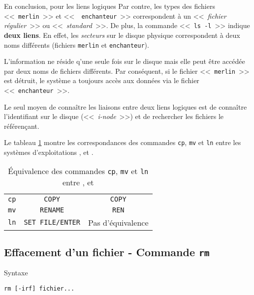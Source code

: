 \begin{definition}{En conclusion, pour les liens logiques}
Par contre, les types des fichiers <<~{\tt merlin}~>> et <<~{\tt
enchanteur}~>> correspondent {\`a} un <<~{\sl fichier r{\'e}gulier}~>>
ou <<~{\sl standard}~>>. De plus, la commande <<~{\tt ls -l}~>> indique
{\bf deux liens}. En effet, les {\it secteurs} sur le disque physique
correspondent {\`a} deux noms diff{\'e}rents (fichiers {\tt merlin} et
{\tt enchanteur}).

L'information ne r{\'e}side q'une seule fois sur le disque mais elle
peut {\^e}tre acc{\'e}d{\'e}e par deux noms de fichiers diff{\'e}rents.
Par cons{\'e}quent, si le fichier <<~{\tt merlin}~>> est d{\'e}truit,
le syst{\`e}me a toujours acc{\`e}s aux donn{\'e}es via le fichier
<<~{\tt enchanteur}~>>.

Le seul moyen de conna{\^i}tre les liaisons entre deux liens logiques est de
conna{\^i}tre l'identifiant sur le disque (<<~\textsl{i-node}~>>) et de
rechercher les fichiers le r{\'e}f{\'e}ren\c{c}ant.
\end{definition}

Le tableau \ref{tab-cmds-equiv-mvcpln} montre les correspondances des commandes
{\tt cp}, {\tt mv} et {\tt ln} entre les syst{\`e}mes d'exploitations {\Unix},
{\OpenVMS} et {\DOS}.

\begin{table}[hbtp]
\centering
\begin{tabular}{|c|c|c|}
	\hline
		{\Unix}		&	{\OpenVMS}	&	{\DOS}					\\
	\hline \hline
		{\tt cp}		&	{\tt COPY}		&	{\tt COPY}				\\
		{\tt mv}		&	{\tt RENAME}	&	{\tt REN}	\\
		{\tt ln}		&	{\tt SET FILE/ENTER} 	&	Pas d'{\'e}quivalence	\\
	\hline
\end{tabular}
\caption{\label{tab-cmds-equiv-mvcpln}\'{E}quivalence des commandes {\tt cp},
{\tt mv} et {\tt ln} entre {\Unix},{\OpenVMS} et {\DOS}}
\end{table}

\subsection{Effacement d'un fichier - Commande {\tt rm}}

\begin{definition}{Syntaxe}
\begin{verbatim}
rm [-irf] fichier...
\end{verbatim}
\end{definition}


